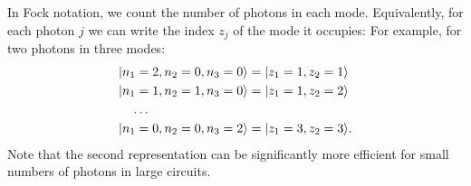 In Fock notation, we count the number of photons in each mode. Equivalently, for each photon $j$ we can write the index $z_j$ of the mode it occupies:
For example, for two photons in three modes:
\begin{align*}
    &  \mbox{$ | n_1=2, n_2=0, n_3=0 \rangle $} = \mbox{$ | z_1=1, z_2=1 \rangle $}\\
    &  \mbox{$ | n_1=1, n_2=1, n_3=0 \rangle $} = \mbox{$ | z_1=1, z_2=2 \rangle $}\\
    &\quad \ldots\\
    &  \mbox{$ | n_1=0, n_2=0, n_3=2 \rangle $} = \mbox{$ | z_1=3, z_2=3 \rangle $}.
\end{align*}
Note that the second representation can be significantly more efficient for small numbers of photons in large circuits.
%

